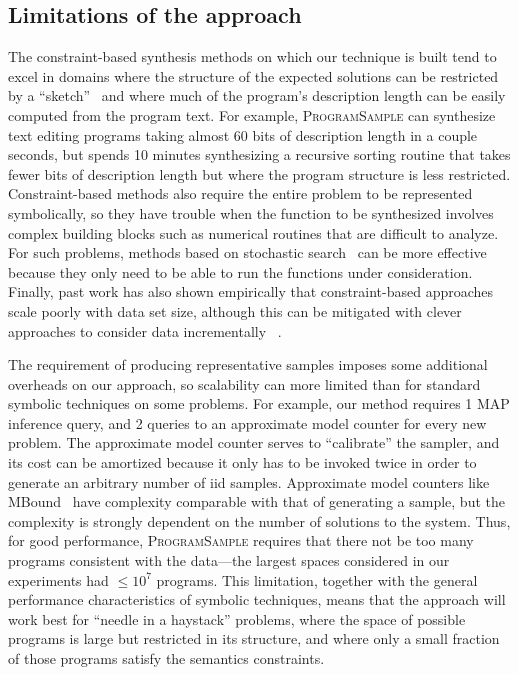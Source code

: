 \documentclass{article}
\newcommand{\theSystem}{\textsc{ProgramSample}}
\begin{document}
\subsection{Limitations of the approach}

The constraint-based synthesis methods on which our technique is built tend to excel in domains where the structure of the expected solutions can be restricted by a ``sketch''~\cite{solar2008program} and where much of the program's description length can be easily computed from the program text. 
For example, \theSystem{} can synthesize text editing programs taking almost 60 bits of description length in a couple seconds, but spends 10 minutes synthesizing a recursive sorting routine that takes fewer bits of description length but where the program structure is less restricted. 
Constraint-based methods also require the entire problem to be represented symbolically, so they have trouble when the function to be synthesized involves complex building blocks such as numerical routines that are difficult to analyze.
For such problems, methods based on stochastic search~\cite{nori2015efficient,schkufza2013stochastic,DBLP:books/daglib/0070933} can be more effective because they only need to be able to run the functions under consideration. Finally, past work has also shown empirically that constraint-based approaches scale poorly with data set size, although this can be mitigated with clever approaches to consider data incrementally ~\cite{ellis2015unsupervised,raychev2016learning}.


The requirement of producing representative samples imposes some additional overheads on our approach, so scalability can  more limited than for standard symbolic techniques on some problems. For example, our method requires 1 MAP inference query, and 2 queries to an approximate model counter for every new problem. The approximate model counter serves to ``calibrate'' the sampler, and its cost can be amortized because it only has to be invoked twice in order to generate an arbitrary number of iid samples. Approximate model counters like MBound~\cite{gomes2006model}
have complexity comparable with that of generating a sample, but the complexity is strongly dependent on the number of solutions to the system. 
Thus, for good performance, \theSystem{} requires that there not be too many programs consistent with the data---the largest spaces considered in our experiments had  $\leq 10^7$ programs. This limitation, together with the general performance characteristics of symbolic techniques, means that the approach will work best for ``needle in a haystack'' problems, where the space of possible programs is large but restricted in its structure, and where only a small fraction of those programs satisfy the semantics constraints.
\end{document}
